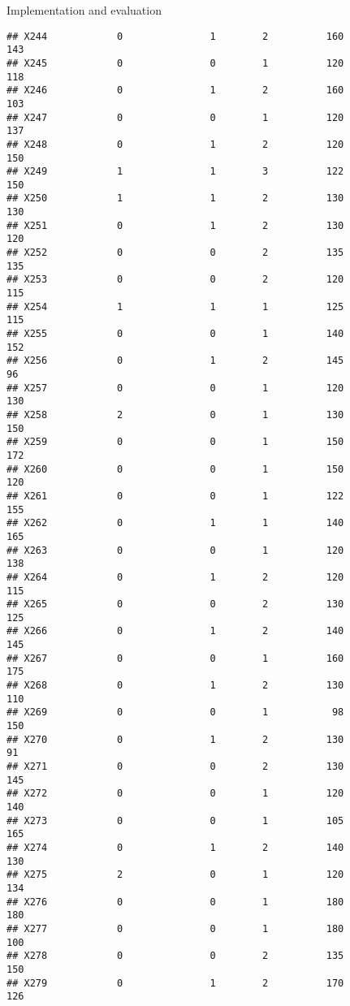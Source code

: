 \documentclass[
  ignorenonframetext,
]{beamer}
\begin{document}
\begin{frame}[fragile]{Implementation and evaluation}
\begin{verbatim}
## X244            0               1        2          160            143
## X245            0               0        1          120            118
## X246            0               1        2          160            103
## X247            0               0        1          120            137
## X248            0               1        2          120            150
## X249            1               1        3          122            150
## X250            1               1        2          130            130
## X251            0               1        2          130            120
## X252            0               0        2          135            135
## X253            0               0        2          120            115
## X254            1               1        1          125            115
## X255            0               0        1          140            152
## X256            0               1        2          145             96
## X257            0               0        1          120            130
## X258            2               0        1          130            150
## X259            0               0        1          150            172
## X260            0               0        1          150            120
## X261            0               0        1          122            155
## X262            0               1        1          140            165
## X263            0               0        1          120            138
## X264            0               1        2          120            115
## X265            0               0        2          130            125
## X266            0               1        2          140            145
## X267            0               0        1          160            175
## X268            0               1        2          130            110
## X269            0               0        1           98            150
## X270            0               1        2          130             91
## X271            0               0        2          130            145
## X272            0               0        1          120            140
## X273            0               0        1          105            165
## X274            0               1        2          140            130
## X275            2               0        1          120            134
## X276            0               0        1          180            180
## X277            0               0        1          180            100
## X278            0               0        2          135            150
## X279            0               1        2          170            126

\end{verbatim}
\end{frame}
\end{document}
